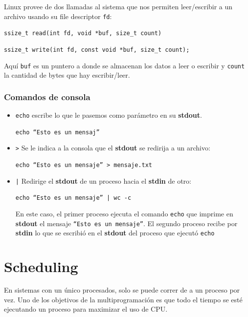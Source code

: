 	Linux provee de dos llamadas al sistema que nos permiten leer/escribir a un archivo usando su file descriptor \texttt{fd}:
	
	\begin{center}
		\texttt{ssize\_t read(int fd, void *buf, size\_t count)}

		\texttt{ssize\_t write(int fd, const void *buf, size\_t count);}
	\end{center}
	
Aquí \texttt{buf} es un puntero a donde se almacenan los datos a leer o escribir y \texttt{count} la cantidad de bytes que hay escribir/leer.

\subsubsection{Comandos de consola}
\begin{itemize}
	\item \texttt{echo} escribe lo que le pasemos como parámetro en su \textbf{stdout}.
	\begin{center}
		\texttt{echo ``Esto es un mensaj''}	\end{center}
	\item \texttt{>} Se le indica a la consola que el \textbf{stdout} se redirija a un archivo:
	\begin{center}
		\texttt{echo ``Esto es un mensaje'' > mensaje.txt}
	\end{center}
	\item \texttt{|} Redirige el \textbf{stdout} de un proceso hacia el \textbf{stdin} de otro:
	
	\begin{center}
		\texttt{echo ``Esto es un mensaje'' | wc -c}
	\end{center}

	En este caso, el primer proceso ejecuta el comando \texttt{echo} que imprime en \textbf{stdout} el mensaje \texttt{``Esto es un mensaje''}. El segundo proceso recibe por \textbf{stdin} lo que se escribió en el \textbf{stdout} del proceso que ejecutó \texttt{echo}
\end{itemize}
\printbibliography[keyword=procesos,title=Bibliografía]

\newpage
	
\section{Scheduling} 
	En sistemas con un único procesados, solo se puede correr de a un proceso por vez. Uno de los objetivos de la multiprogramación es que todo el tiempo se esté ejecutando un proceso para maximizar el uso de CPU.
	
